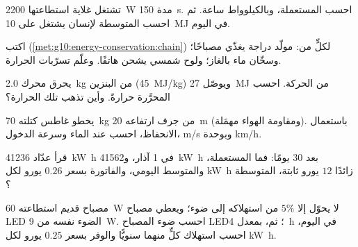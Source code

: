 \begin{exercise}[$\star$]\label{exo:g10:energy-conservation:4}
تشتغل غلاية استطاعتها \qty{2200}{W} مدة \qty{150}{s}. احسب 
المستعملة،  وبالكيلوواط ساعة. ثم احسب 
المتوسطة لإنسان يشتغل على \qty{10}{MJ} في اليوم.
\end{exercise}

\begin{exercise}[$\star$]\label{exo:g10:energy-conservation:5}
اكتب  (\cref{met:g10:energy-conservation:chain})
لكلٍّ من: مولّد دراجة يغذّي مصباحًا؛ وسخّان ماء بالغاز؛ ولوح
شمسي يشحن هاتفًا. وعلّم تسرّبات الحرارة.
\end{exercise}

\begin{exercise}[$\star\star$]\label{exo:g10:energy-conservation:6}
يحرق محرك \qty{2.0}{kg} من البنزين (\qty{45}{MJ/kg}) ويوصّل
\qty{27}{MJ} من الحركة. احسب  
المحرَّرة حرارةً. وأين تذهب تلك الحرارة؟
\end{exercise}

\begin{exercise}[$\star\star$]\label{exo:g10:energy-conservation:7}
يخطو غاطس كتلته \qty{70}{kg} من جرف ارتفاعه \qty{20}{m} (ومقاومة
الهواء مهمَلة). باستعمال الانحفاظ، احسب 
عند الماء وسرعة الدخول،  \unit{m/s} وبوحدة \unit{km/h}.
\end{exercise}

\begin{exercise}[$\star\star$]\label{exo:g10:energy-conservation:8}
قرأ عدّاد \qty{41236}{kW.h} في 1 آذار، و\qty{41562}{kW.h} بعد 30
يومًا: فما  المستعملة، والمتوسط اليومي، والفاتورة بسعر $0.26$ يورو لكل
\unit{kW.h} زائدًا $12$ يورو ثابتة،  المتوسطة ؟
\end{exercise}

\begin{exercise}[$\star\star$]\label{exo:g10:energy-conservation:9}
مصباح قديم استطاعته \qty{60}{W} لا يحوّل إلا $5\%$ من استهلاكه إلى
ضوء؛ ويعطي مصباح LED الضوء نفسه من \qty{9}{W}. احسب
 ضوء المصباح  LED؛ ثم، بمعدل \qty{4}{h} في
اليوم، احسب استهلاك كلٍّ منهما سنويًّا والوفر بسعر $0.25$ يورو
لكل \unit{kW.h}.
\end{exercise}

